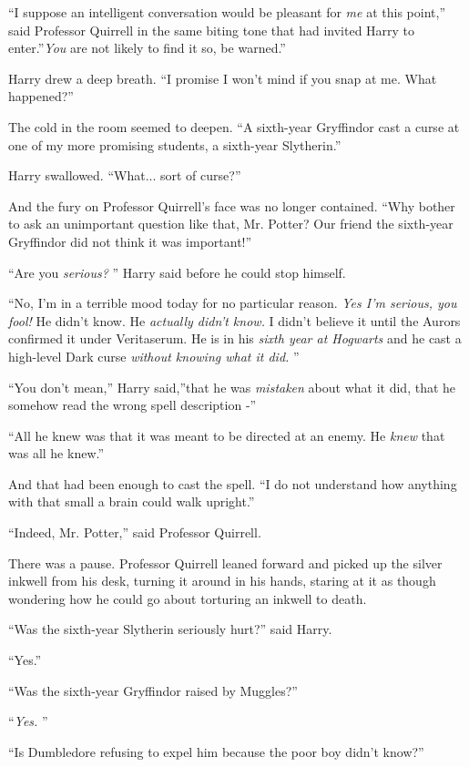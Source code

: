 ``I suppose an intelligent conversation would be pleasant for \emph{me}
at this point,'' said Professor Quirrell in the same biting tone that
had invited Harry to enter.''\emph{You} are not likely to find it so, be
warned.''

Harry drew a deep breath. ``I promise I won't mind if you snap at me.
What happened?''

The cold in the room seemed to deepen. ``A sixth-year Gryffindor cast a
curse at one of my more promising students, a sixth-year Slytherin.''

Harry swallowed. ``What... sort of curse?''

And the fury on Professor Quirrell's face was no longer contained. ``Why
bother to ask an unimportant question like that, Mr. Potter? Our friend
the sixth-year Gryffindor did not think it was important!''

``Are you \emph{serious?} '' Harry said before he could stop himself.

``No, I'm in a terrible mood today for no particular reason. \emph{Yes
I'm serious, you fool!} He didn't know. He \emph{actually didn't know.}
I didn't believe it until the Aurors confirmed it under Veritaserum. He
is in his \emph{sixth year at Hogwarts} and he cast a high-level Dark
curse \emph{without knowing what it did.} ''

``You don't mean,'' Harry said,''that he was \emph{mistaken} about what
it did, that he somehow read the wrong spell description -''

``All he knew was that it was meant to be directed at an enemy. He
\emph{knew} that was all he knew.''

And that had been enough to cast the spell. ``I do not understand how
anything with that small a brain could walk upright.''

``Indeed, Mr. Potter,'' said Professor Quirrell.

There was a pause. Professor Quirrell leaned forward and picked up the
silver inkwell from his desk, turning it around in his hands, staring at
it as though wondering how he could go about torturing an inkwell to
death.

``Was the sixth-year Slytherin seriously hurt?'' said Harry.

``Yes.''

``Was the sixth-year Gryffindor raised by Muggles?''

``\emph{Yes.} ''

``Is Dumbledore refusing to expel him because the poor boy didn't
know?''

